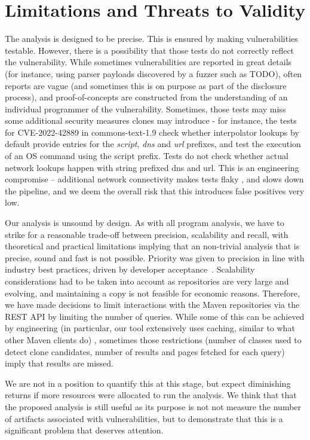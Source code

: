 \section{Limitations and Threats to Validity}
\label{sec:threats}

The analysis is designed to be precise. This is ensured by making vulnerabilities testable. However, there is a possibility that those tests do not correctly reflect the vulnerability. While sometimes vulnerabilities are reported in great details (for instance, using parser payloads discovered by a fuzzer such as TODO), often reports are vague (and sometimes this is on purpose as part of the disclosure process), and proof-of-concepts are constructed from the understanding of an individual programmer of the vulnerability. Sometimes, those tests may miss some additional security measures clones may introduce - for instance, the tests for CVE-2022-42889 in commons-text-1.9 check whether interpolator lookups by default provide entries for the \textit{script}, \textit{dns} and \textit{url} prefixes, and test the execution of an OS command using the script prefix. Tests do not check whether actual network lookups happen with string prefixed dns and url. This is an engineering compromise -- additional network connectivity makes tests flaky , and slows down the pipeline, and we deem the overall risk that this introduces false positives very low. 

Our analysis is unsound by design. As with all program analysis, we have to strike for a reasonable trade-off between precision, scalability and recall, with theoretical and practical limitations implying that an non-trivial analysis that is precise, sound and fast is not possible. Priority was given to precision in line with industry best practices, driven by developer acceptance~\cite{bessey2010few, sadowski2018lessons, distefano2019scaling}.  Scalability considerations had to be taken into account as repositories are very large and evolving, and maintaining a copy is not feasible for economic reasons. Therefore, we have made decisions to limit interactions with  the Maven repositories via the REST API by limiting the number of queries. While some of this can be achieved by engineering (in particular, our tool extensively uses caching, similar to what other Maven clients do) , sometimes those restrictions (number of classes used to detect clone candidates, number of results and pages fetched for each query) imply that results are missed. 

We are not in a position to quantify this at this stage, but expect diminishing returns if more resources were allocated to run the analysis.  We think that that the proposed analysis is still useful as its purpose is not not measure the number of artifacts associated with vulnerabilities, but to demonstrate that this is a significant problem that deserves attention.

